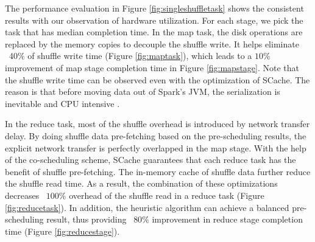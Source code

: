 The performance evaluation in Figure \ref{fig:singleshuffletask} shows the consistent results with our observation of hardware utilization. 
For each stage, we pick the task that has median completion time. 
In the map task, the disk operations are replaced by the memory copies to decouple the shuffle write. 
It helps eliminate ~40\% of shuffle write time (Figure \ref{fig:maptask}), which leads to a $10\%$ improvement of map stage completion time in Figure \ref{fig:mapstage}. 
Note that the shuffle write time can be observed even with the optimization of SCache. 
The reason is that before moving data out of Spark's JVM, the serialization is inevitable and CPU intensive \cite{makingsense}. 

In the reduce task, most of the shuffle overhead is introduced by network transfer delay. 
By doing shuffle data pre-fetching based on the pre-scheduling results, the explicit network transfer is perfectly overlapped in the map stage. 
With the help of the co-scheduling scheme, SCache guarantees that each reduce task has the benefit of shuffle pre-fetching. 
The in-memory cache of shuffle data further reduce the shuffle read time. 
As a result, the combination of these optimizations decreases ~$100\%$ overhead of the shuffle read in a reduce task (Figure \ref{fig:reducetask}). 
In addition, the heuristic algorithm can achieve a balanced pre-scheduling result, thus providing ~$80\%$ improvement in reduce stage completion time (Figure \ref{fig:reducestage}).

